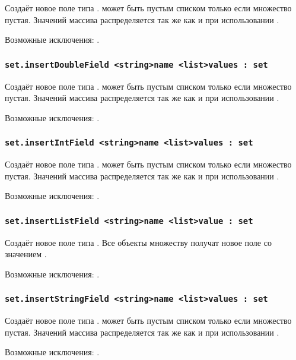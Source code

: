 Создаёт новое поле типа \bool.  может быть пустым списком только если множество пустая. Значений массива распределяется так же как и при использовании .

Возможные исключения: .

\subsubsection{\lstinline|set.insertDoubleField <string>name <list>values : set|}

Создаёт новое поле типа \double.  может быть пустым списком только если множество пустая. Значений массива распределяется так же как и при использовании .

Возможные исключения: .

\subsubsection{\lstinline|set.insertIntField <string>name <list>values : set|}

Создаёт новое поле типа \integer.  может быть пустым списком только если множество пустая. Значений массива распределяется так же как и при использовании .

Возможные исключения: .

\subsubsection{\lstinline|set.insertListField <string>name <list>value : set|}

Создаёт новое поле типа \bool. Все объекты множеству получат новое поле со значением .

Возможные исключения: .

\subsubsection{\lstinline|set.insertStringField <string>name <list>values : set|}

Создаёт новое поле типа \str.  может быть пустым списком только если множество пустая. Значений массива распределяется так же как и при использовании .

Возможные исключения: .

